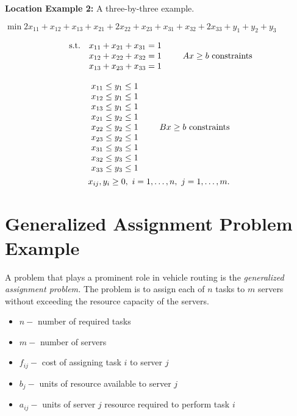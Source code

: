 \documentclass[11pt]{article}
\renewcommand{\_}{{\char"5F}}
\renewcommand{\{}{{\char"7B}}
\renewcommand{\}}{{\char"7D}}
\renewcommand{\^}{{\char"0D}}
\renewcommand{\'}{{\char"0D}}
\begin{document}
\vskip 12pt

{\bf Location Example 2:} A three-by-three example.

\vskip 10pt
$\min                                                    
2x_{11}+x_{12}+x_{13}+x_{21}+2x_{22}+x_{23}+x_{31}+x_{32}+2x_{33}+
y_{1}+y_{2}+y_{3}$


\[
\begin{array}{llll}
{\rm s.t.} &x_{11}+x_{21}+x_{31} = 1 & & \\
&x_{12}+x_{22}+x_{32} = 1 & &   \\
&x_{13}+x_{23}+x_{33} = 1 & &
\end{array}   Ax \ge b \,\, {\rm constraints}
  \]
  
  
\begin{eqnarray*}
\begin{array}{lll}
x_{11}\leq y_{1}\leq 1 & &  \\
x_{12}\leq y_{1}\leq 1 & & \\
x_{13}\leq y_{1}\leq 1 & & \\
x_{21}\leq y_{2}\leq 1 & & \\
x_{22}\leq y_{2}\leq 1 & &   \\
x_{23}\leq y_{2}\leq 1 & & \\
x_{31}\leq y_{3}\leq 1 & & \\
x_{32}\leq y_{3}\leq 1 & &\\
x_{33}\leq y_{3}\leq 1 & &\\ 
\end{array}
 Bx \ge b \,\, {\rm constraints} \\
x_{ij},y_{i}\ge 0 , \,\, i = 1, \ldots, n, \, \, j = 1, \ldots, m.   
\end{eqnarray*}






\section{Generalized Assignment Problem Example}

A problem that plays a prominent role in
vehicle routing is the {\it generalized assignment problem.}    The problem is to assign each of $n$
tasks to $m$ servers without exceeding the resource capacity of the servers.

\begin{itemize}
\item[]  $n -$ number of required tasks
\item[]  $m -$   number of servers
\item[]  $f_{ij} -$ cost of assigning task $i$ to server $j$
\item[]  $b_{j} -$  units of resource available to server $j$
\item[]  $a_{ij} -$ units of server $j$ resource required to perform task $i$
\end{itemize}
\end{document}
